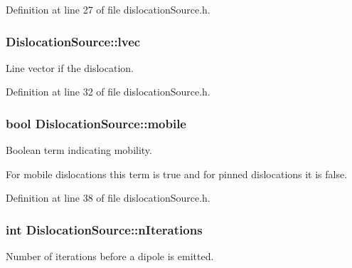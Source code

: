 Definition at line 27 of file dislocation\-Source.\-h.

\hypertarget{classDislocationSource_a6a1ab6dc549236d2335a200e601781ea}{
\subsubsection[{lvec}]{ Dislocation\-Source\-::lvec\hspace{0.3cm}{\ttfamily [protected]}}}\label{de/de3/classDislocationSource_a6a1ab6dc549236d2335a200e601781ea}


Line vector if the dislocation. 



Definition at line 32 of file dislocation\-Source.\-h.

\hypertarget{classDislocationSource_a7cfb4fd64ac4da8c79398b6e2c732875}{
\subsubsection[{mobile}]{\setlength{\rightskip}{0pt plus 5cm}bool Dislocation\-Source\-::mobile\hspace{0.3cm}{\ttfamily [protected]}}}\label{de/de3/classDislocationSource_a7cfb4fd64ac4da8c79398b6e2c732875}


Boolean term indicating mobility. 

For mobile dislocations this term is true and for pinned dislocations it is false. 

Definition at line 38 of file dislocation\-Source.\-h.

\hypertarget{classDislocationSource_aacf42c7505f28b50280b23b435024e17}{
\subsubsection[{n\-Iterations}]{\setlength{\rightskip}{0pt plus 5cm}int Dislocation\-Source\-::n\-Iterations\hspace{0.3cm}{\ttfamily [protected]}}}\label{de/de3/classDislocationSource_aacf42c7505f28b50280b23b435024e17}


Number of iterations before a dipole is emitted. 

